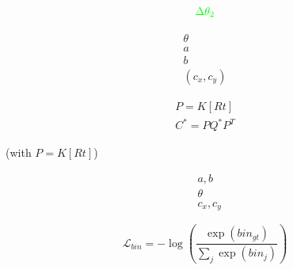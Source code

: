 \begin{equation}
    \color{green}  \Delta \theta_2
\end{equation}


\begin{equation}
\begin{split}
    \theta\\
    a\\
    b\\
    (c_x, c_y)
    \end{split}
\end{equation}


\begin{equation}
    \begin{split}
         P = K[Rt] \\
        C^* = P Q^* P^T
    \end{split}
\end{equation}

(with $P = K[Rt]$)

\begin{equation}
    \begin{split}
         &a, b \\
         &\theta \\
         &c_x, c_y
    \end{split}
\end{equation}


\begin{equation}
    \mathcal{L}_{bin} = -\log \left(\frac{\exp(bin_{gt})}{\sum_j \exp(bin_j)}\right)
\end{equation}
